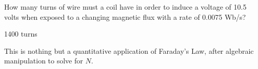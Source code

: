 

How many turns of wire must a coil have in order to induce a voltage of 10.5 volts when exposed to a changing magnetic flux with a rate of 0.0075 Wb/s?







1400 turns







This is nothing but a quantitative application of Faraday's Law, after algebraic manipulation to solve for $N$.




